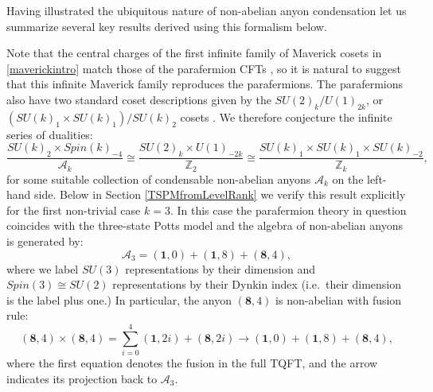 \documentclass[11pt]{article}
\numberwithin{equation}{section}
\begin{document}
Having illustrated the ubiquitous nature of non-abelian anyon condensation let us summarize several key results derived using this formalism below.  

Note that the central charges of the first infinite family of Maverick cosets in \eqref{maverickintro}  match those of the parafermion CFTs \cite{Fateev:1985mm,DiFrancesco:1997nk}, so it is natural to suggest that this infinite Maverick family reproduces the parafermions. The parafermions also have two standard coset descriptions given by the $SU(2)_{k}/U(1)_{2k}$, or $(SU(k)_{1} \times SU(k)_{1})/SU(k)_{2}$ cosets \cite{DiFrancesco:1997nk}. We therefore conjecture the infinite series of dualities:
\begin{equation} 
    \frac{SU(k)_{2} \times Spin(k)_{-4}}{\mathcal{A}_{k}} \cong \frac{SU(2)_{k} \times U(1)_{-2k}}{\mathbb{Z}_{2}} \cong \frac{SU(k)_{1} \times SU(k)_{1} \times SU(k)_{-2}}{\mathbb{Z}_{k}},
\end{equation}
for some suitable collection of condensable non-abelian anyons $\mathcal{A}_{k}$ on the left-hand side. Below in Section \ref{TSPMfromLevelRank} we verify this result explicitly for the first non-trivial case $k=3$.  In this case the parafermion theory in question coincides with the three-state Potts model and the algebra of non-abelian anyons is generated by:
\begin{equation}
    \mathcal{A}_{3} = (\mathbf{1},0) + (\mathbf{1},8) + (\mathbf{8},4),
\end{equation}
where we label $SU(3)$ representations by their dimension and $Spin(3)\cong SU(2)$ representations by their Dynkin index (i.e.\ their dimension is the label plus one.)  In particular, the anyon $(\mathbf{8},4)$ is non-abelian with fusion rule:
\begin{equation}
    (\mathbf{8},4)\times (\mathbf{8},4)=  \sum_{i=0}^{4}(\mathbf{1},2i) + (\mathbf{8},2i)\rightarrow (\mathbf{1},0)+  (\mathbf{1},8) + (\mathbf{8},4),
\end{equation}
where the first equation denotes the fusion in the full TQFT, and the arrow indicates its projection back to $\mathcal{A}_{3}.$
\end{document}
